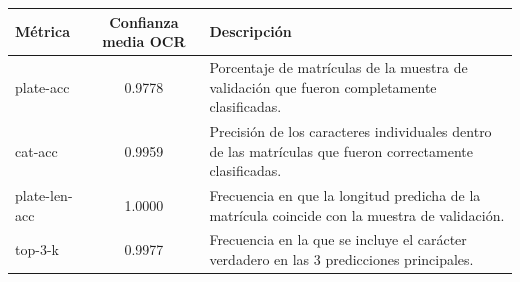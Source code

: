 \sffamily
\footnotesize
{}
\begin{tcolorbox}[
  colback=white,
  colframe=MASA-Blue,
  title={Tabla~\thetable~Resumen de métricas de validación},
  boxrule=0.5mm,
  arc=2mm,
  width=\textwidth,
  enhanced,
  fonttitle=\bfseries,
  before upper=\vspace{2mm},
  after upper=\vspace{2mm}
]
\label{tab:augmentation_impact}
\renewcommand{\arraystretch}{1.5}
\begin{tabularx}{\textwidth}{@{}l c X}
\textbf{Métrica} & \textbf{Confianza media OCR} & \textbf{Descripción} \\
\midrule
plate-acc & 0.9778 & Porcentaje de matrículas de la muestra de validación que fueron completamente clasificadas. \\
cat-acc & 0.9959 & Precisión de los caracteres individuales dentro de las matrículas que fueron correctamente clasificadas. \\
plate-len-acc & 1.0000 & Frecuencia en que la longitud predicha de la matrícula coincide con la muestra de validación. \\
top-3-k & 0.9977 & Frecuencia en la que se incluye el carácter verdadero en las 3 predicciones principales. \\
\end{tabularx}
\end{tcolorbox}
\normalsize
\normalfont

